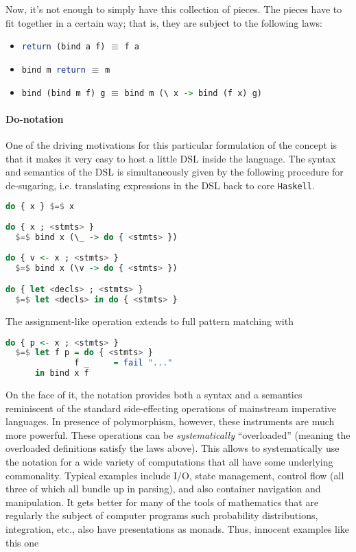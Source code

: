Now, it's not enough to simply have this collection of pieces. The
pieces have to fit together in a certain way; that is, they are
subject to the following laws:

\begin{itemize}
  \item \lstinline[language=Haskell]!return (bind a f)! $\equiv$ \lstinline[language=Haskell]!f a! %
  \item \lstinline[language=Haskell]!bind m return! $\equiv$ \lstinline[language=Haskell]!m! %
  \item \lstinline[language=Haskell]!bind (bind m f) g! $\equiv$ \lstinline[language=Haskell]!bind m (\ x -> bind (f x) g)! %
\end{itemize}

\paragraph{Do-notation}
One of the driving motivations for this particular formulation of the
concept is that it makes it very easy to host a little DSL inside the
language. The syntax and semantics of the DSL is simultaneously given
by the following procedure for de-sugaring, i.e. translating
expressions in the DSL back to core \texttt{Haskell}.

\begin{lstlisting}[language=Haskell,mathescape=true]
do { x } $=$ x
 
do { x ; <stmts> }
  $=$ bind x (\_ -> do { <stmts> })
 
do { v <- x ; <stmts> }
  $=$ bind x (\v -> do { <stmts> }) 

do { let <decls> ; <stmts> }
  $=$ let <decls> in do { <stmts> }
\end{lstlisting} 

The assignment-like operation extends to full pattern matching with

\begin{lstlisting}[language=Haskell,mathescape=true]
  do { p <- x ; <stmts> }
  $=$ let f p = do { <stmts> }
              f _     = fail "..."
      in bind x f
\end{lstlisting}

On the face of it, the notation provides both a syntax and a semantics
reminiscent of the standard side-effecting operations of mainstream
imperative languages. In presence of polymorphism, however, these
instruments are much more powerful. These operations can be
\emph{systematically} ``overloaded'' (meaning the overloaded
definitions satisfy the laws above). This allows to systematically use
the notation for a wide variety of computations that all have some
underlying commonality. Typical examples include I/O, state
management, control flow (all three of which all bundle up in
parsing), and also container navigation and manipulation. It gets
better for many of the tools of mathematics that are regularly the
subject of computer programs such probability distributions,
integration, etc., also have presentations as monads. Thus, innocent
examples like this one

